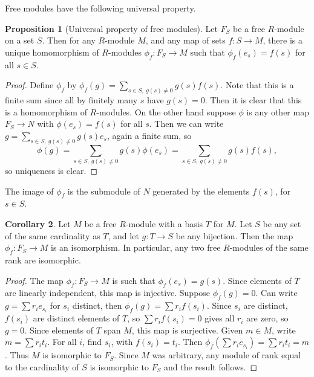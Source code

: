 \documentclass{article}
\newcommand{\rb}[1]{\left( #1 \right)}
\theoremstyle{definition}\newtheorem{definition}{Definition}[subsection]
\theoremstyle{definition}\newtheorem{remark}[definition]{Remark}
\theoremstyle{definition}\newtheorem*{example}{Example}
\theoremstyle{definition}\newtheorem*{note}{Note}
\newtheorem{proposition}[definition]{Proposition}
\newtheorem{corollary}[definition]{Corollary}
\begin{document}
Free modules have the following universal property.

\begin{proposition}[Universal property of free modules]
Let $ F_S $ be a free $ R $-module on a set $ S $. Then for any $ R $-module $ M $, and any map of sets $ f : S \to M $, there is a unique homomorphism of $ R $-modules $ \phi_f : F_S \to M $ such that $ \phi_f\rb{e_s} = f\rb{s} $ for all $ s \in S $.
\end{proposition}

\begin{proof}
Define $ \phi_f $ by $ \phi_f\rb{g} = \sum_{s \in S, \ g\rb{s} \ne 0} g\rb{s}f\rb{s} $. Note that this is a finite sum since all by finitely many $ s $ have $ g\rb{s} = 0 $. Then it is clear that this is a homomorphism of $ R $-modules. On the other hand suppose $ \phi $ is any other map $ F_S \to N $ with $ \phi\rb{e_s} = f\rb{s} $ for all $ s $. Then we can write $ g = \sum_{s \in S, \ g\rb{s} \ne 0} g\rb{s}e_s $, again a finite sum, so
$$ \phi\rb{g} = \sum_{s \in S, \ g\rb{s} \ne 0} g\rb{s}\phi\rb{e_s} = \sum_{s \in S, \ g\rb{s} \ne 0} g\rb{s}f\rb{s}, $$
so uniqueness is clear.
\end{proof}

The image of $ \phi_f $ is the submodule of $ N $ generated by the elements $ f\rb{s} $, for $ s \in S $.

\begin{corollary}
Let $ M $ be a free $ R $-module with a basis $ T $ for $ M $. Let $ S $ be any set of the same cardinality as $ T $, and let $ g : T \to S $ be any bijection. Then the map $ \phi_f : F_S \to M $ is an isomorphism. In particular, any two free $ R $-modules of the same rank are isomorphic.
\end{corollary}

\begin{proof}
The map $ \phi_f : F_S \to M $ is such that $ \phi_f\rb{e_s} = g\rb{s} $. Since elements of $ T $ are linearly independent, this map is injective. Suppose $ \phi_f\rb{g} = 0 $. Can write $ g = \sum r_ie_{s_i} $ for $ s_i $ distinct, then $ \phi_f\rb{g} = \sum r_if\rb{s_i} $. Since $ s_i $ are distinct, $ f\rb{s_i} $ are distinct elements of $ T $, so $ \sum r_if\rb{s_i} = 0 $ gives all $ r_i $ are zero, so $ g = 0 $. Since elements of $ T $ span $ M $, this map is surjective. Given $ m \in M $, write $ m = \sum r_it_i $. For all $ i $, find $ s_i $, with $ f\rb{s_i} = t_i $. Then $ \phi_f\rb{\sum r_ie_{s_i}} = \sum r_it_i = m $. Thus $ M $ is isomorphic to $ F_S $. Since $ M $ was arbitrary, any module of rank equal to the cardinality of $ S $ is isomorphic to $ F_S $ and the result follows.
\end{proof}
\end{document}
